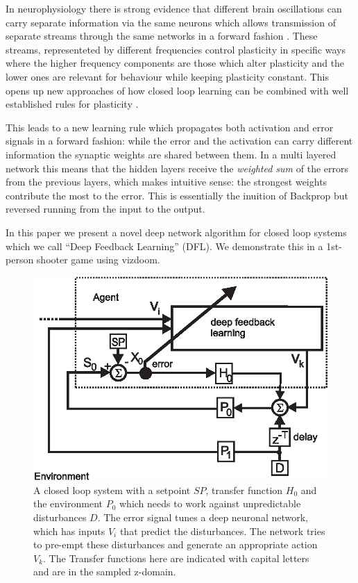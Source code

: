 \documentclass{article}
\begin{document}
In neurophysiology there is strong evidence that different
brain oscillations can carry separate information via the same neurons
which allows transmission of separate streams through the same
networks in a forward fashion \cite{Canolty2010}. These streams,
representeted by different frequencies control plasticity in specific
ways where the higher frequency components are those which alter
plasticity and the lower ones are relevant for behaviour while keeping
plasticity constant. This opens up new approaches of how closed loop
learning can be combined with well established rules for plasticity
\cite{Hebb49, Bliss73, Luescher2012}.

This leads to a new learning rule which propagates both activation and
error signals in a forward fashion: while the error and the activation
can carry different information the synaptic weights are shared
between them. In a multi layered network this means that the hidden
layers receive the \textsl{weighted sum} of the errors from the
previous layers, which makes intuitive sense: the strongest weights
contribute the most to the error. This is essentially the inuition
of Backprop but reversed running from the input to the output.

In this paper we present a novel deep network algorithm for closed
loop systems which we call ``Deep Feedback Learning'' (DFL).
We demonstrate this in a 1st-person shooter game using vizdoom.

\begin{figure}[!ht]
  \centering
  \includegraphics[width=0.75\columnwidth]{closed_loop}
  \caption{A closed loop system with a setpoint $SP$, transfer function $H_0$ and the
    environment $P_0$ which needs to work against unpredictable disturbances $D$.
    The error signal tunes a deep neuronal network, which has inputs
    $V_i$ that predict the disturbances. The network tries to pre-empt these
    disturbances and generate an appropriate action $V_k$. The Transfer
    functions here are indicated with capital letters and are in the
    sampled z-domain.
    \label{closed_loop}}
\end{figure}
\end{document}
